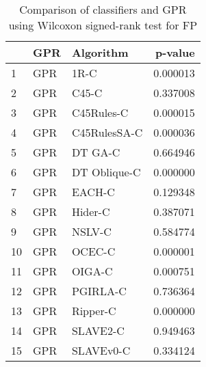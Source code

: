 \begin{table}
\footnotesize
\caption{Comparison of classifiers and GPR using Wilcoxon signed-rank test for FP}
\label{tab:GPR wilcoxon FP comparison}
\begin{tabular}{lllr}
\hline
 & GPR & Algorithm & p-value \\
\hline
1 & GPR & 1R-C & 0.000013 \\
2 & GPR & C45-C & 0.337008 \\
3 & GPR & C45Rules-C & 0.000015 \\
4 & GPR & C45RulesSA-C & 0.000036 \\
5 & GPR & DT GA-C & 0.664946 \\
6 & GPR & DT Oblique-C & 0.000000 \\
7 & GPR & EACH-C & 0.129348 \\
8 & GPR & Hider-C & 0.387071 \\
9 & GPR & NSLV-C & 0.584774 \\
10 & GPR & OCEC-C & 0.000001 \\
11 & GPR & OIGA-C & 0.000751 \\
12 & GPR & PGIRLA-C & 0.736364 \\
13 & GPR & Ripper-C & 0.000000 \\
14 & GPR & SLAVE2-C & 0.949463 \\
15 & GPR & SLAVEv0-C & 0.334124 \\
\hline
\end{tabular}
\end{table}
